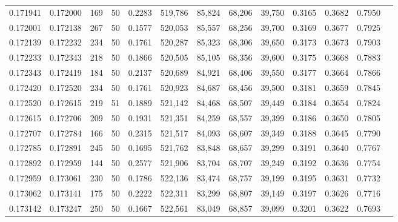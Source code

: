 \begin{tabular}{rrrrrrrrrrrrr}
0.171941 & 0.172000 &   169 &  50 &                                     0.2283 & 519,786 &  85,824 &  68,206 &  39,750 & 0.3165 & 0.3682 & 0.7950 \\
0.172001 & 0.172138 &   267 &  50 &                                     0.1577 & 520,053 &  85,557 &  68,256 &  39,700 & 0.3169 & 0.3677 & 0.7925 \\
0.172139 & 0.172232 &   234 &  50 &                                     0.1761 & 520,287 &  85,323 &  68,306 &  39,650 & 0.3173 & 0.3673 & 0.7903 \\
0.172233 & 0.172343 &   218 &  50 &                                     0.1866 & 520,505 &  85,105 &  68,356 &  39,600 & 0.3175 & 0.3668 & 0.7883 \\
0.172343 & 0.172419 &   184 &  50 &                                     0.2137 & 520,689 &  84,921 &  68,406 &  39,550 & 0.3177 & 0.3664 & 0.7866 \\
0.172420 & 0.172520 &   234 &  50 &                                     0.1761 & 520,923 &  84,687 &  68,456 &  39,500 & 0.3181 & 0.3659 & 0.7845 \\
0.172520 & 0.172615 &   219 &  51 &                                     0.1889 & 521,142 &  84,468 &  68,507 &  39,449 & 0.3184 & 0.3654 & 0.7824 \\
0.172615 & 0.172706 &   209 &  50 &                                     0.1931 & 521,351 &  84,259 &  68,557 &  39,399 & 0.3186 & 0.3650 & 0.7805 \\
0.172707 & 0.172784 &   166 &  50 &                                     0.2315 & 521,517 &  84,093 &  68,607 &  39,349 & 0.3188 & 0.3645 & 0.7790 \\
0.172785 & 0.172891 &   245 &  50 &                                     0.1695 & 521,762 &  83,848 &  68,657 &  39,299 & 0.3191 & 0.3640 & 0.7767 \\
0.172892 & 0.172959 &   144 &  50 &                                     0.2577 & 521,906 &  83,704 &  68,707 &  39,249 & 0.3192 & 0.3636 & 0.7754 \\
0.172959 & 0.173061 &   230 &  50 &                                     0.1786 & 522,136 &  83,474 &  68,757 &  39,199 & 0.3195 & 0.3631 & 0.7732 \\
0.173062 & 0.173141 &   175 &  50 &                                     0.2222 & 522,311 &  83,299 &  68,807 &  39,149 & 0.3197 & 0.3626 & 0.7716 \\
0.173142 & 0.173247 &   250 &  50 &                                     0.1667 & 522,561 &  83,049 &  68,857 &  39,099 & 0.3201 & 0.3622 & 0.7693 \\

\end{tabular}
